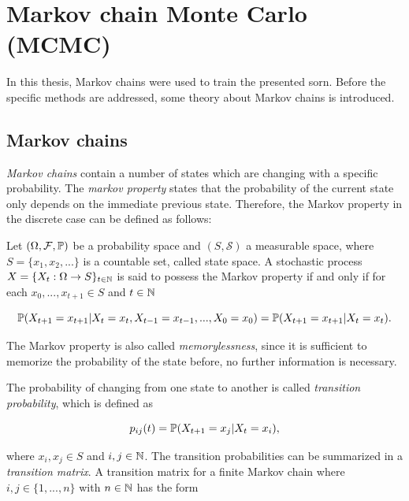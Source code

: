 \section{Markov chain Monte Carlo (MCMC)}

In this thesis, Markov chains were used to train the presented \acl{sorn}. Before the specific methods are addressed, some theory about Markov chains is introduced.

\subsection{Markov chains}

\emph{Markov chains} contain a number of states which are changing with a specific probability. The \emph{markov property} states that the probability of the current state only depends on the immediate previous state. Therefore, the Markov property in the discrete case can be defined as follows:

\begin{definition}
Let $(\Omega, \mathcal{F}, \mathbb{P})$ be a probability space and $(S, \mathcal{S})$ a measurable space, where $S = \{x_1, x_2, ... \}$ is a countable set, called state space. A stochastic process $X = \{ X_t : \Omega \to S\}_{t\in\mathbb{N}}$ is said to possess the Markov property if and only if for each $x_0, ..., x_{t+1}\in S$ and $t\in\mathbb{N}$

\begin{equation}
\label{eq:markov-chain}
\mathbb{P}(X_{t+1} = x_{t+1} | X_{t} = x_{t}, X_{t-1} = x_{t-1}, ..., X_0 = x_0) = \mathbb{P}(X_{t+1} = x_{t+1} | X_{t} = x_{t}).
\end{equation}
\end{definition}

The Markov property is also called \emph{memorylessness}, since it is sufficient to memorize the probability of the state before, no further information is necessary.

The probability of changing from one state to another is called \emph{transition probability}, which is defined as

\begin{equation}
\label{eq:trans-prob}
p_{ij}(t) = \mathbb{P}(X_{t+1} = x_j | X_{t} = x_i),
\end{equation}

where $x_i, x_j \in S$ and $i,j \in \mathbb{N}$. The transition probabilities can be summarized in a \emph{transition matrix}. A transition matrix for a finite Markov chain where $i,j \in \{1, ..., n\}$ with $n \in\mathbb{N}$ has the form

